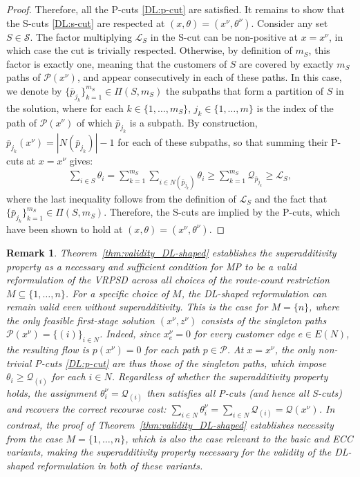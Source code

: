 \documentclass{article}
\newtheorem{remark}{Remark}
\newcommand{\rev}[1]{{\color{black}#1}}
\begin{document}
\begin{proof}
Therefore, all the P-cuts \eqref{DL:p-cut} are satisfied. It remains to show that the S-cuts \eqref{DL:s-cut} are respected at $(x,\theta) = (x^{\nu},\theta^{\nu})$. Consider any set $S \in \mathcal{S}$. The factor multiplying $\mathcal{L}_{S}$ in the S-cut can be non-positive at $x = x^{\nu}$, in which case the cut is trivially respected. Otherwise, by definition of $m_S$, this factor is exactly one, meaning that the customers of $S$ are covered by exactly $m_S$ paths of $\mathcal{P}(x^{\nu})$, and appear consecutively in each of these paths. In this case, we denote by $\{\bar{p}_{j_k}\}_{k=1}^{m_S} \in \Pi(S,m_S)$ the subpaths that form a partition of $S$ in the solution, where for each $k \in \{1,\dots,m_S\}$, $j_k \in \{1,\dots,m\}$ is the index of the path of $\mathcal{P}(x^{\nu})$ of which $\bar{p}_{j_k}$ is a subpath. By construction, $\bar{p}_{j_k}(x^{\nu})=|N(\bar{p}_{j_k})|-1$ for each of these subpaths, so that summing their P-cuts at $x=x^{\nu}$ gives:
\begin{align*}
    \sum_{i \in S}\theta_i = \sum_{k=1}^{m_S} \sum_{i \in N(\bar{p}_{j_k})} \theta_i \geq \sum_{k=1}^{m_S} \mathcal{Q}_{\bar{p}_{j_k}} \geq \mathcal{L}_{S},
\end{align*}
where the last inequality follows from the definition of $\mathcal{L}_{S}$ and the fact that $\{\bar{p}_{j_k}\}_{k=1}^{m_S} \in \Pi(S,m_S)$. Therefore, the S-cuts are implied by the P-cuts, which have been shown to hold at $(x,\theta) = (x^{\nu},\theta^{\nu})$. 
\end{proof}

\rev{
\begin{remark}\label{rem:necessity}
Theorem~\ref{thm:validity_DL-shaped} establishes the superadditivity property as a necessary and sufficient condition for MP to be a valid reformulation of the VRPSD across all choices of the route-count restriction \(M \subseteq \{1,\ldots,n\}\). For a specific choice of $M$, the DL-shaped reformulation can remain valid even without superadditivity. This is the case for $M = \{n\}$, where the only feasible first-stage solution $(x^{\nu}, z^{\nu})$ consists of the singleton paths $\mathcal{P}(x^{\nu}) = \{(i)\}_{i \in N}$. Indeed, since $x^{\nu}_e = 0$ for every customer edge $e \in E(N)$, the resulting flow is $p(x^{\nu}) = 0$ for each path $p \in \mathcal{P}$. At $x = x^{\nu}$, the only non-trivial P-cuts \eqref{DL:p-cut} are thus those of the singleton paths, which impose $\theta_i \geq \mathcal{Q}_{(i)}$ for each $i \in N$. Regardless of whether the superadditivity property holds, the assignment $\theta^{\nu}_i = \mathcal{Q}_{(i)}$ then satisfies all P-cuts (and hence all S-cuts) and recovers the correct recourse cost: $\sum_{i \in N}\theta^{\nu}_i = \sum_{i \in N}\mathcal{Q}_{(i)} = \mathcal{Q}(x^{\nu})$. In contrast, the proof of Theorem~\ref{thm:validity_DL-shaped} establishes necessity from the case $M = \{1, \dots, n\}$, which is also the case relevant to the basic and ECC variants, making the superadditivity property necessary for the validity of the DL-shaped reformulation in both of these variants.
\end{remark}
}
\end{document}
